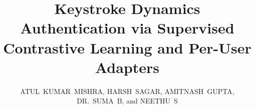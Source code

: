 \documentclass{ieeeaccess}
\newcommand{\orcidicon}{\raisebox{-0.1ex}{\textcolor{orcidgreen}{\textsf{\textbf{\footnotesize \textcircled{\tiny iD}}}}}}
\newcommand{\orcidlink}[1]{\href{https://orcid.org/#1}{\orcidicon}}
\begin{document}

\title{Keystroke Dynamics Authentication via Supervised Contrastive Learning and Per-User Adapters}

\author{
\uppercase{Atul~Kumar~Mishra}\orcidlink{0009-0007-9697-0261},
\uppercase{Harsh~Sagar}\orcidlink{0009-0006-6097-2479},
\uppercase{Amitnash~Gupta}\orcidlink{0009-0004-8299-5546},
\uppercase{Dr.~Suma~B}\orcidlink{0000-0001-7337-1855},
and
\uppercase{Neethu~S}\orcidlink{0000-0002-8440-5229}
}

\address[1]{Department of Computer Science and Engineering, 
Rashtreeya Vidyalaya College of Engineering (RVCE), 
Bengaluru, Karnataka, India.}

\address[2]{Department of Computer Science and Engineering, 
Rashtreeya Vidyalaya College of Engineering (RVCE), 
Bengaluru, Karnataka, India.}

\address[3]{Department of Computer Science and Engineering, 
Rashtreeya Vidyalaya College of Engineering (RVCE), 
Bengaluru, Karnataka, India.}

\end{document}

